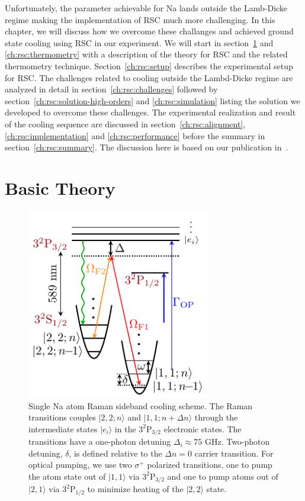 Unfortunately, the parameter achievable for Na lands outside the Lamb-Dicke regime
making the implementation of RSC much more challenging.
In this chapter, we will discuss how we overcome these challanges
and achieved ground state cooling using RSC in our experiment.
We will start in section~\ref{ch:rsc:basic-theory} and \ref{ch:rsc:thermometry}
with a description of the theory for RSC and the related thermometry technique.
Section~\ref{ch:rsc:setup} describes the experimental setup for RSC.
The challenges related to cooling outside the Lambd-Dicke regime are analyzed in detail
in section~\ref{ch:rsc:challenges} followed by
section~\ref{ch:rsc:solution-high-orders} and \ref{ch:rsc:simulation}
listing the solution we developed to overcome these challenges.
The experimental realization and result of the cooling sequence
are discussed in section~\ref{ch:rsc:alignment}, \ref{ch:rsc:implementation}
and \ref{ch:rsc:performance} before the summary in section~\ref{ch:rsc:summary}.
The discussion here is based on our publication in~\cite{yu_motional-ground-state_2018}.

\section{Basic Theory}
\label{ch:rsc:basic-theory}

\begin{figure}
  \centering
  \includegraphics[width=8cm]{figures/na_rsc_schematics.pdf}
  \caption[Schematics of Raman sideband cooling for Sodium.]{
    Single Na atom Raman sideband cooling scheme.
    The Raman transitions couples $|2,2;n\rangle$ and $|1,1;n+\Delta n\rangle$
    through the intermediate states $|e_i\rangle$ in the $\mathrm{3^2P_{3/2}}$ electronic states.
    The transitions have a one-photon detuning $\Delta_i\approx75$ GHz.
    Two-photon detuning, $\delta$, is defined relative to the $\Delta n=0$ carrier transition.
    For optical pumping, we use two $\sigma^+$ polarized transitions,
    one to pump the atom state out of $|1,1\rangle$ via $\mathrm{3^2P_{3/2}}$
    and one to pump atoms out of $|2,1\rangle$ via $\mathrm{3^2P_{1/2}}$
    to minimize heating of the $|2,2\rangle$ state.
    \label{fig:rsc:na-schematics}}
\end{figure}

